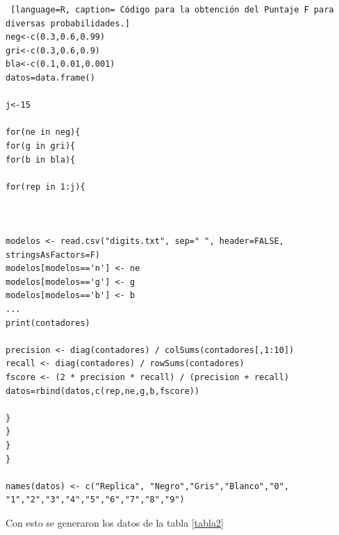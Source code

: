 \documentclass{article}
\begin{document}
\begin{lstlisting} [language=R, caption= Código para la obtención del Puntaje F para diversas probabilidades.] 
neg<-c(0.3,0.6,0.99)
gri<-c(0.3,0.6,0.9)
bla<-c(0.1,0.01,0.001)
datos=data.frame()

j<-15

for(ne in neg){
for(g in gri){
for(b in bla){
  
for(rep in 1:j){
    


modelos <- read.csv("digits.txt", sep=" ", header=FALSE, stringsAsFactors=F)
modelos[modelos=='n'] <- ne
modelos[modelos=='g'] <- g
modelos[modelos=='b'] <- b
...
print(contadores)

precision <- diag(contadores) / colSums(contadores[,1:10])
recall <- diag(contadores) / rowSums(contadores)
fscore <- (2 * precision * recall) / (precision + recall) 
datos=rbind(datos,c(rep,ne,g,b,fscore))

}
}
}
}

names(datos) <- c("Replica", "Negro","Gris","Blanco","0", "1","2","3","4","5","6","7","8","9")
\end{lstlisting}

Con esto se generaron los datos de la tabla \ref{tabla2}

\begin{table}[h!]
\centering
\caption{Ejemplo de datos obtenidos.}
\label{tabla2}
\end{table}
\end{document}
